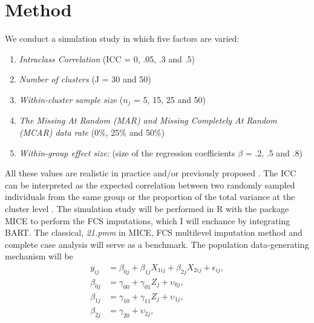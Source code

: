 \documentclass[10pt, a4paper, titlepage]{article}
\begin{document}
\section{Method}
We conduct a simulation study in which five factors are varied:
\begin{enumerate}
	\item \textit{Intraclass Correlation} (ICC = 0, .05, .3 and .5)
	\item \textit{Number of clusters} (J = 30 and 50)
	\item \textit{Within-cluster sample size}  ($n_{j}$ = 5, 15, 25 and 50)
	\item \textit{The Missing At Random (MAR) and Missing Completely At Random (MCAR) data rate} (0\%, 25\% and 50\%)
	\item \textit{Within-group effect size:} (size of the regression coefficients $\beta$ = .2, .5 and .8)
\end{enumerate}
All these values are realistic in practice and/or previously proposed \cite{gulliford1999, murray2003, hox2017, grund2018, enders2018a, enders2020}. The ICC can be interpreted as the expected correlation between two randomly sampled individuals from the same group or the proportion of the total variance at the cluster level \cite{gulliford2005, shieh2012, hox2017}. The simulation study will be performed in R with the package MICE \cite{buuren2011} to perform the FCS imputations, which I will enchance by integrating BART. The classical, \textit{21.pmm} in MICE,  FCS multilevel imputation method \cite{ludtke2017, enders2018a, enders2020} and complete case analysis will serve as a benchmark. The population data-generating mechanism will be
\begin{subequations}
\label{eq:population}
\begin{align}
y_{ij} &= \beta_{0j} + \beta_{1j}X_{1ij} + \beta_{2j}X_{2ij} + \epsilon_{ij}, \tag{1.1} \\
\beta_{0j} &= \gamma_{00} + \gamma_{01}Z_{j} + \upsilon_{0j}, \tag{1.2} \\
\beta_{1j} &= \gamma_{10} + \gamma_{11}Z_{j} + \upsilon_{1j}, \tag{1.3} \\
\beta_{2j} &= \gamma_{20} +  \upsilon_{2j}, \tag{1.4}
\end{align}
\end{subequations}
\end{document}
